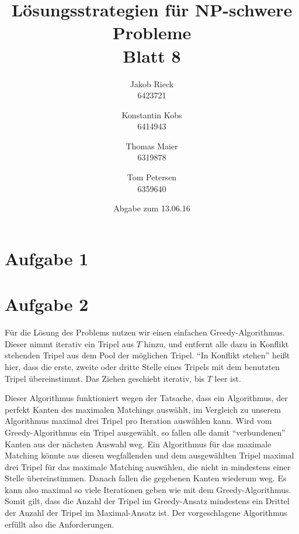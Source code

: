 \documentclass[12pt,a4paper]{article}
\title{Lösungsstrategien für NP-schwere Probleme\\Blatt 8}
\author{
		Jakob Rieck\\
		\small{6423721}
	\and
		Konstantin Kobs\\
		\small{6414943}
	\and
		Thomas Maier\\
		\small{6319878}
	\and
		Tom Petersen\\
		\small{6359640}
}
\date{Abgabe zum 13.06.16}
\begin{document}
\maketitle

\section*{Aufgabe 1}



\section*{Aufgabe 2}

Für die Lösung des Problems nutzen wir einen einfachen Greedy-Algorithmus. Dieser nimmt iterativ ein Tripel aus $T$ hinzu, und entfernt alle dazu in Konflikt stehenden Tripel aus dem Pool der möglichen Tripel. "`In Konflikt stehen"' heißt hier, dass die erste, zweite oder dritte Stelle eines Tripels mit dem benutzten Tripel übereinstimmt. Das Ziehen geschieht iterativ, bis $T$ leer ist. 

Dieser Algorithmus funktioniert wegen der Tatsache, dass ein Algorithmus, der perfekt Kanten des maximalen Matchings auswählt, im Vergleich zu unserem Algorithmus maximal drei Tripel pro Iteration auswählen kann. Wird vom Greedy-Algorithmus ein Tripel ausgewählt, so fallen alle damit "`verbundenen"' Kanten aus der nächsten Auswahl weg. Ein Algorithmus für das maximale Matching könnte aus diesen wegfallenden und dem ausgewählten Tripel maximal drei Tripel für das maximale Matching auswählen, die nicht in mindestens einer Stelle übereinstimmen. Danach fallen die gegebenen Kanten wiederum weg. Es kann also maximal so viele Iterationen geben wie mit dem Greedy-Algorithmus. Somit gilt, dass die Anzahl der Tripel im Greedy-Ansatz mindestens ein Drittel der Anzahl der Tripel im Maximal-Ansatz ist. Der vorgeschlagene Algorithmus erfüllt also die Anforderungen.
\end{document}
